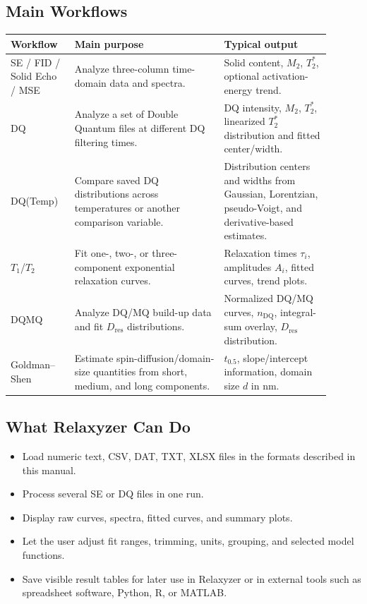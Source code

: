 \documentclass[11pt,a4paper]{article}
\newcommand{\Relaxyzer}{Relaxyzer}
\newcommand{\TtwoStar}{\ensuremath{T_2^{\ast}}}
\newcommand{\Mtwo}{\ensuremath{M_2}}
\newcommand{\Dres}{\ensuremath{D_{\mathrm{res}}}}
\newcommand{\nDQ}{\ensuremath{n_{\mathrm{DQ}}}}
\newcommand{\Tone}{\ensuremath{T_1}}
\newcommand{\Ttwo}{\ensuremath{T_2}}
\begin{document}
\subsection{Main Workflows}
\begin{longtable}{p{0.18\linewidth}p{0.42\linewidth}p{0.30\linewidth}}
\toprule
Workflow & Main purpose & Typical output \\
\midrule
SE / FID / Solid Echo / MSE & Analyze three-column time-domain data and spectra. & Solid content, \Mtwo{}, \TtwoStar{}, optional activation-energy trend. \\
DQ & Analyze a set of Double Quantum files at different DQ filtering times. & DQ intensity, \Mtwo{}, \TtwoStar{}, linearized \TtwoStar{} distribution and fitted center/width. \\
DQ(Temp) & Compare saved DQ distributions across temperatures or another comparison variable. & Distribution centers and widths from Gaussian, Lorentzian, pseudo-Voigt, and derivative-based estimates. \\
\Tone{}/\Ttwo{} & Fit one-, two-, or three-component exponential relaxation curves. & Relaxation times \(\tau_i\), amplitudes \(A_i\), fitted curves, trend plots. \\
DQMQ & Analyze DQ/MQ build-up data and fit \Dres{} distributions. & Normalized DQ/MQ curves, \nDQ{}, integral-sum overlay, \Dres{} distribution. \\
Goldman--Shen & Estimate spin-diffusion/domain-size quantities from short, medium, and long components. & \(t_{0.5}\), slope/intercept information, domain size \(d\) in nm. \\
\bottomrule
\end{longtable}

\subsection{What Relaxyzer Can Do}
\begin{itemize}
  \item Load numeric text, CSV, DAT, TXT, XLSX files in the formats described in this manual.
  \item Process several SE or DQ files in one run.
  \item Display raw curves, spectra, fitted curves, and summary plots.
  \item Let the user adjust fit ranges, trimming, units, grouping, and selected model functions.
  \item Save visible result tables for later use in \Relaxyzer{} or in external tools such as spreadsheet software, Python, R, or MATLAB.
\end{itemize}
\end{document}
